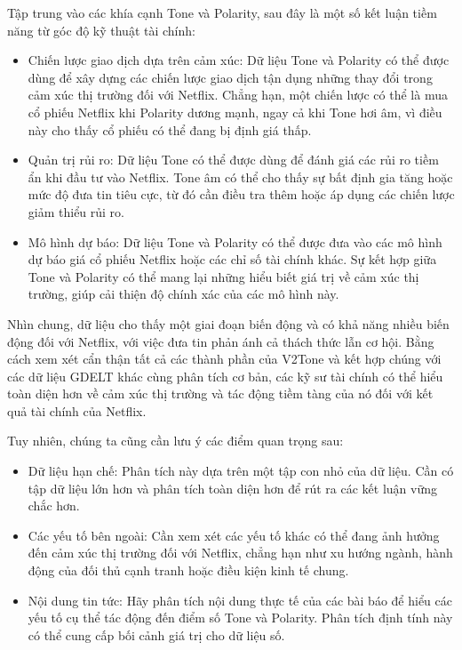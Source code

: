 Tập trung vào các khía cạnh Tone và Polarity, sau đây là một số kết luận tiềm năng từ góc độ kỹ thuật tài chính:

\begin{itemize}
\item
  Chiến lược giao dịch dựa trên cảm xúc: Dữ liệu Tone và Polarity có thể được dùng để xây dựng các chiến lược giao dịch tận dụng những thay đổi trong cảm xúc thị trường đối với Netflix. Chẳng hạn, một chiến lược có thể là mua cổ phiếu Netflix khi Polarity dương mạnh, ngay cả khi Tone hơi âm, vì điều này cho thấy cổ phiếu có thể đang bị định giá thấp.
\item
  Quản trị rủi ro: Dữ liệu Tone có thể được dùng để đánh giá các rủi ro tiềm ẩn khi đầu tư vào Netflix. Tone âm có thể cho thấy sự bất định gia tăng hoặc mức độ đưa tin tiêu cực, từ đó cần điều tra thêm hoặc áp dụng các chiến lược giảm thiểu rủi ro.
\item
  Mô hình dự báo: Dữ liệu Tone và Polarity có thể được đưa vào các mô hình dự báo giá cổ phiếu Netflix hoặc các chỉ số tài chính khác. Sự kết hợp giữa Tone và Polarity có thể mang lại những hiểu biết giá trị về cảm xúc thị trường, giúp cải thiện độ chính xác của các mô hình này.
\end{itemize}

Nhìn chung, dữ liệu cho thấy một giai đoạn biến động và có khả năng nhiều biến động đối với Netflix, với việc đưa tin phản ánh cả thách thức lẫn cơ hội. Bằng cách xem xét cẩn thận tất cả các thành phần của V2Tone và kết hợp chúng với các dữ liệu GDELT khác cùng phân tích cơ bản, các kỹ sư tài chính có thể hiểu toàn diện hơn về cảm xúc thị trường và tác động tiềm tàng của nó đối với kết quả tài chính của Netflix.

Tuy nhiên, chúng ta cũng cần lưu ý các điểm quan trọng sau:

\begin{itemize}
\item
  Dữ liệu hạn chế: Phân tích này dựa trên một tập con nhỏ của dữ liệu. Cần có tập dữ liệu lớn hơn và phân tích toàn diện hơn để rút ra các kết luận vững chắc hơn.
\item
  Các yếu tố bên ngoài: Cần xem xét các yếu tố khác có thể đang ảnh hưởng đến cảm xúc thị trường đối với Netflix, chẳng hạn như xu hướng ngành, hành động của đối thủ cạnh tranh hoặc điều kiện kinh tế chung.
\item
  Nội dung tin tức: Hãy phân tích nội dung thực tế của các bài báo để hiểu các yếu tố cụ thể tác động đến điểm số Tone và Polarity. Phân tích định tính này có thể cung cấp bối cảnh giá trị cho dữ liệu số.
\end{itemize}

